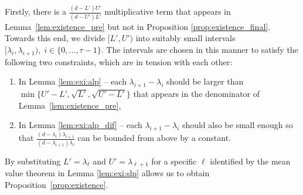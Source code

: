 \documentclass[onecolumn,letterpaper]{IEEEtran}
\newcommand{\up}{{U}}
\newcommand{\lw}{{L}}
\newcommand{\exi}{{i}}
\newcommand{\exind}{{\ell}}
\newcommand{\sig}{{\lambda}}
\newcommand{\sigi}{{\sig_{\exi}}}
\newcommand{\sigio}{{\sig_{\exi+1}}}
\newcommand{\sigind}{{\sig_{\exind}}}
\newcommand{\sigindo}{{\sig_{\exind+1}}}
\newcommand{\ta}{{\tau}}
\begin{document}
Firstly, there is a $\frac{ (d-\lw') \up' }{(d-\up')\lw'}$ multiplicative term that appears in Lemma~\ref{lem:existence_pre} but not in Proposition \ref{prop:existence_final}. Towards this end, we divide $[\lw',\up')$ into suitably small intervals $[\sigi,\sigio),\; \exi\in \{0,\dots, \ta-1\}$. The intervals are chosen in this manner to satisfy the following two constraints, which are in tension with each other:  
\begin{enumerate}[label=(\roman*)]
    \item In Lemma \ref{lem:exi:alp} -- each $\sigio - \sigi$ should be larger than $\min\{ \up'-\lw' , \sqrt{\lw'} , \sqrt{\up'-\lw'} \}$ that appears in the denominator of Lemma~\ref{lem:existence_pre},
    \item In Lemma \ref{lem:exi:alp_dif} -- each $\sigio - \sigi$ should  also be small enough so that $\frac{ (d-\sigi) \sigio }{(d-\sigio)\sigi}$ can be bounded from above by a constant.
\end{enumerate}
 By substituting $\lw' = \sigind$ and $\up' = \sigindo$ for a specific $\exind$ identified by the mean value theorem in Lemma \ref{lem:exi:slp} allows us to obtain Proposition~\ref{prop:existence}.








\end{document}
